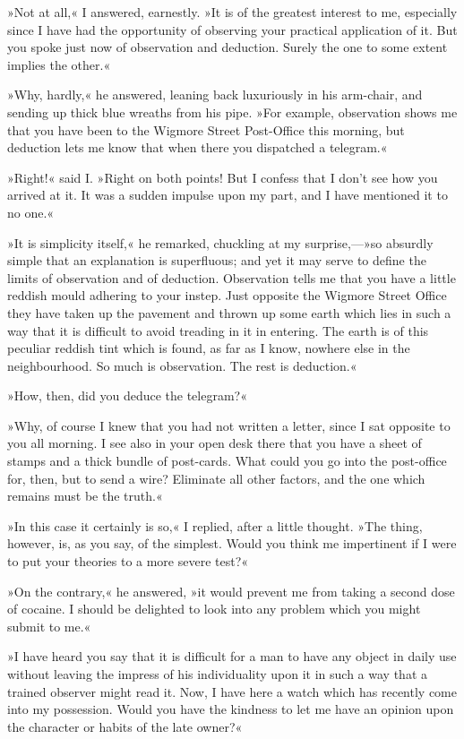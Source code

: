 »Not at all,« I answered, earnestly. »It is of the greatest interest to me, especially since I have had the opportunity of observing your practical application of it. But you spoke just now of observation and deduction. Surely the one to some extent implies the other.«

»Why, hardly,« he answered, leaning back luxuriously in his arm-chair, and sending up thick blue wreaths from his pipe. »For example, observation shows me that you have been to the Wigmore Street Post-Office this morning, but deduction lets me know that when there you dispatched a telegram.«

»Right!« said I. »Right on both points! But I confess that I don't see how you arrived at it. It was a sudden impulse upon my part, and I have mentioned it to no one.«

»It is simplicity itself,« he remarked, chuckling at my surprise,—»so absurdly simple that an explanation is superfluous; and yet it may serve to define the limits of observation and of deduction. Observation tells me that you have a little reddish mould adhering to your instep. Just opposite the Wigmore Street Office they have taken up the pavement and thrown up some earth which lies in such a way that it is difficult to avoid treading in it in entering. The earth is of this peculiar reddish tint which is found, as far as I know, nowhere else in the neighbourhood. So much is observation. The rest is deduction.«

»How, then, did you deduce the telegram?«

»Why, of course I knew that you had not written a letter, since I sat opposite to you all morning. I see also in your open desk there that you have a sheet of stamps and a thick bundle of post-cards. What could you go into the post-office for, then, but to send a wire? Eliminate all other factors, and the one which remains must be the truth.«

»In this case it certainly is so,« I replied, after a little thought. »The thing, however, is, as you say, of the simplest. Would you think me impertinent if I were to put your theories to a more severe test?«

»On the contrary,« he answered, »it would prevent me from taking a second dose of cocaine. I should be delighted to look into any problem which you might submit to me.«

»I have heard you say that it is difficult for a man to have any object in daily use without leaving the impress of his individuality upon it in such a way that a trained observer might read it. Now, I have here a watch which has recently come into my possession. Would you have the kindness to let me have an opinion upon the character or habits of the late owner?«

